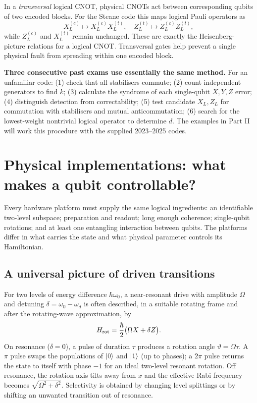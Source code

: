 In a \emph{transversal} logical CNOT, physical CNOTs act between corresponding qubits of two encoded blocks. For the Steane code this maps logical Pauli operators as
\begin{equation}\label{eq:transversal}
X_L^{(c)}\mapsto X_L^{(c)}X_L^{(t)},\quad
Z_L^{(t)}\mapsto Z_L^{(c)}Z_L^{(t)},
\end{equation}
while $Z_L^{(c)}$ and $X_L^{(t)}$ remain unchanged. These are exactly the Heisenberg-picture relations for a logical CNOT. Transversal gates help prevent a single physical fault from spreading within one encoded block.

\begin{examtip}
\textbf{Three consecutive past exams use essentially the same method.} For an unfamiliar code: (1) check that all stabilisers commute; (2) count independent generators to find $k$; (3) calculate the syndrome of each single-qubit $X,Y,Z$ error; (4) distinguish detection from correctability; (5) test candidate $X_L,Z_L$ for commutation with stabilisers and mutual anticommutation; (6) search for the lowest-weight nontrivial logical operator to determine $d$. The examples in Part II will work this procedure with the supplied 2023--2025 codes.
\end{examtip}

\section{Physical implementations: what makes a qubit controllable?}\label{sec:platforms}
Every hardware platform must supply the same logical ingredients: an identifiable two-level subspace; preparation and readout; long enough coherence; single-qubit rotations; and at least one entangling interaction between qubits. The platforms differ in what carries the state and what physical parameter controls its Hamiltonian.

\subsection{A universal picture of driven transitions}
For two levels of energy difference $\hbar\omega_0$, a near-resonant drive with amplitude $\Omega$ and detuning $\delta=\omega_0-\omega_d$ is often described, in a suitable rotating frame and after the rotating-wave approximation, by
\begin{equation}\label{eq:rabi}
H_{\rm rot}=\frac\hbar2\big(\Omega X+\delta Z\big).
\end{equation}
On resonance ($\delta=0$), a pulse of duration $\tau$ produces a rotation angle $\vartheta=\Omega\tau$. A $\pi$ pulse swaps the populations of $\left\lvert 0\right\rangle$ and $\left\lvert 1\right\rangle$ (up to phases); a $2\pi$ pulse returns the state to itself with phase $-1$ for an ideal two-level resonant rotation. Off resonance, the rotation axis tilts away from $x$ and the effective Rabi frequency becomes $\sqrt{\Omega^2+\delta^2}$. Selectivity is obtained by changing level splittings or by shifting an unwanted transition out of resonance.

